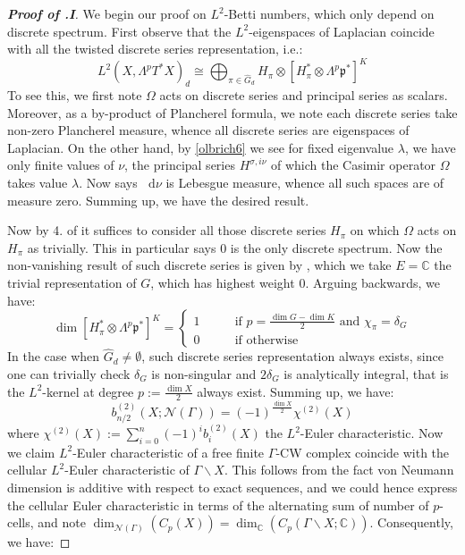 \documentclass[11pt]{report}
\theoremstyle{definition}
\theoremstyle{plain}
\newcommand{\complex}{\mathbb{C}}
\newcommand{\vna}{\mathcal{N}}
\renewcommand{\hat}{\widehat}
\newcommand{\mass}[1]{\mathop{}\mathrm{d}{#1}}
\newcommand{\Lie}[1]{\mathfrak{#1}}
\begin{document}
\begin{proof}[\textbf{Proof of .I}]
	We begin our proof on $L^2$-Betti numbers, which only depend on discrete spectrum. First observe that the $L^2$-eigenspaces of Laplacian coincide with all the twisted discrete series representation, i.e.:
	\begin{equation}
	L^2(X, \Lambda^pT^*X)_d\cong \bigoplus_{\pi\in \hat{G}_d}H_\pi \otimes [H_\pi^*\otimes \Lambda^p\Lie{p}^*]^K
	\end{equation}
	To see this, we first note $\Omega$ acts on discrete series and principal series as scalars. Moreover, as a by-product of Plancherel formula, we note each discrete series take non-zero Plancherel measure, whence all discrete series are eigenspaces of Laplacian. On the other hand, by \ref{olbrich6} we see for fixed eigenvalue $\lambda$, we have only finite values of $\nu$, the principal series $H^{\sigma, i\nu}$ of which the Casimir operator $\Omega$ takes value $\lambda$. Now  says $\mass{\nu}$ is Lebesgue measure, whence all such spaces are of measure zero. Summing up, we have the desired result. 
	\par Now by 4. of  it suffices to consider all those discrete series $H_\pi$ on which $\Omega$ acts on $H_\pi$ as trivially. This in particular says $0$ is the only discrete spectrum. Now the non-vanishing result of such discrete series is given by , which we take $E=\complex$ the trivial representation of $G$, which has highest weight $0$. Arguing backwards, we have:
	\begin{equation}\label{olbrich9}
	\dim[H_\pi^*\otimes \Lambda^p\Lie{p}^*]^K=\begin{cases}
	1 \qquad &\text{if $p=\frac{\dim G-\dim K}{2}$ and $\chi_\pi=\delta_G$}\\
	0 \qquad & \text{if otherwise}	
	\end{cases}
	\end{equation}
	In the case when $\hat{G}_d\neq \emptyset$, such discrete series representation always exists, since one can trivially check $\delta_G$ is non-singular and $2\delta_G$ is analytically integral, that is the $L^2$-kernel at degree $p:=\frac{\dim X}{2}$ always exist. Summing up, we have:
	\begin{equation}\label{olbrich(9)}
	b^{(2)}_{n/2}(X;\vna(\Gamma))=(-1)^{\frac{\dim X}{2}}\chi^{(2)}(X)
	\end{equation}
	where $\chi^{(2)}(X):=\sum_{i=0}^n(-1)^{i}b_i^{(2)}(X)$ the $L^2$-Euler characteristic. Now we claim $L^2$-Euler characteristic of a free finite $\Gamma$-CW complex coincide with the cellular $L^2$-Euler characteristic of $\Gamma\backslash X$. This follows from the fact von Neumann dimension is additive with respect to exact sequences, and we could hence express the cellular Euler characteristic in terms of the alternating sum of number of $p$-cells, and note $\dim_{\vna(\Gamma)}(C_p(X))=\dim_\complex (C_p(\Gamma\backslash X; \complex))$. Consequently, we have:

\end{proof}
\end{document}

